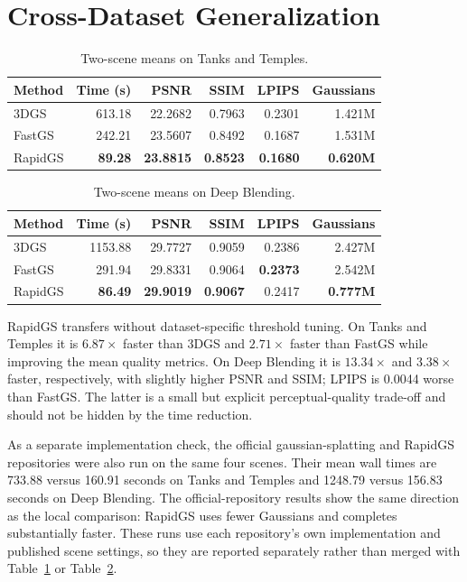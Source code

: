 \section{Cross-Dataset Generalization}

\begin{table}[H]
\centering
\caption{Two-scene means on Tanks and Temples.}
\label{tab:tandt-generalization}
\begin{tabular}{lrrrrr}
\toprule
Method & Time (s) & PSNR & SSIM & LPIPS & Gaussians \\
\midrule
3DGS & 613.18 & 22.2682 & 0.7963 & 0.2301 & 1.421M \\
FastGS & 242.21 & 23.5607 & 0.8492 & 0.1687 & 1.531M \\
RapidGS & \textbf{89.28} & \textbf{23.8815} & \textbf{0.8523} &
\textbf{0.1680} & \textbf{0.620M} \\
\bottomrule
\end{tabular}
\end{table}

\begin{table}[H]
\centering
\caption{Two-scene means on Deep Blending.}
\label{tab:db-generalization}
\begin{tabular}{lrrrrr}
\toprule
Method & Time (s) & PSNR & SSIM & LPIPS & Gaussians \\
\midrule
3DGS & 1153.88 & 29.7727 & 0.9059 & 0.2386 & 2.427M \\
FastGS & 291.94 & 29.8331 & 0.9064 & \textbf{0.2373} & 2.542M \\
RapidGS & \textbf{86.49} & \textbf{29.9019} & \textbf{0.9067} &
0.2417 & \textbf{0.777M} \\
\bottomrule
\end{tabular}
\end{table}

RapidGS transfers without dataset-specific threshold tuning. On Tanks and
Temples it is $6.87\times$ faster than 3DGS and $2.71\times$ faster than
FastGS while improving the mean quality metrics. On Deep Blending it
is $13.34\times$ and $3.38\times$ faster, respectively, with slightly higher
PSNR and SSIM; LPIPS is 0.0044 worse than FastGS. The latter is a
small but explicit perceptual-quality trade-off and should not be hidden by the
time reduction.

As a separate implementation check, the official gaussian-splatting and
RapidGS repositories were also run on the same four scenes. Their mean wall
times are 733.88 versus 160.91 seconds on Tanks and Temples and 1248.79 versus
156.83 seconds on Deep Blending. The official-repository results show the same
direction as the local comparison: RapidGS uses fewer Gaussians and completes
substantially faster. These runs use each repository's own implementation and
published scene settings, so they are reported separately rather than merged
with Table~\ref{tab:tandt-generalization} or
Table~\ref{tab:db-generalization}.

